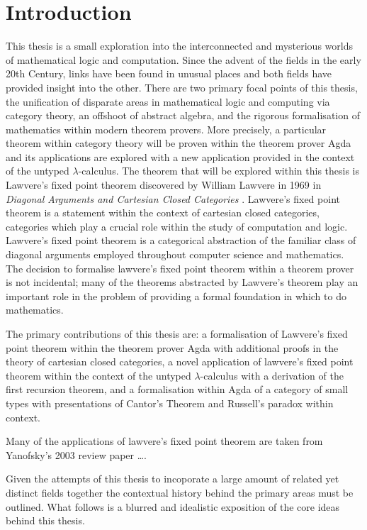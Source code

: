 
\section{Introduction}

This thesis is a small exploration into the interconnected and mysterious worlds
of mathematical logic and computation. Since the advent of the fields in the
early 20th Century, links have been found in unusual places and both fields have
provided insight into the other. There are two primary focal points of this
thesis, the unification of disparate areas in mathematical logic and computing
via category theory, an offshoot of abstract algebra, and the rigorous
formalisation of mathematics within modern theorem provers. More precisely, a
particular theorem within category theory will be proven within the theorem
prover Agda and its applications are explored with a new application provided in
the context of the untyped $\lambda$-calculus. The theorem that will
be explored within this thesis is Lawvere's fixed point theorem discovered by
William Lawvere in 1969 in \textit{Diagonal Arguments and Cartesian Closed
Categories} \cite{lawvere1969diagonal}. Lawvere's fixed point theorem
is a statement within the context of cartesian closed categories, categories
which play a crucial role within the study of computation and logic. Lawvere's
fixed point theorem is a categorical abstraction of the familiar class of
diagonal arguments employed throughout computer science and mathematics. The
decision to formalise lawvere's fixed point theorem within a theorem prover is
not incidental; many of the theorems abstracted by Lawvere's theorem play an
important role in the problem of providing a formal foundation in which to do
mathematics.

The primary contributions of this thesis are: a formalisation of Lawvere's fixed
point theorem within the theorem prover Agda with additional proofs in the
theory of cartesian closed categories, a novel application of lawvere's fixed
point theorem within the context of the untyped $\lambda$-calculus with a
derivation of the first recursion theorem, and a formalisation within Agda of a
category of small types with presentations of Cantor's Theorem and Russell's
paradox within context.

Many of the applications of lawvere's fixed point theorem are taken from
Yanofsky's 2003 review paper \ldots {}.

Given the attempts of this thesis to incoporate a large amount of related yet
distinct fields together the contextual history behind the primary areas must be
outlined. What follows is a blurred and idealistic exposition of the core ideas
behind this thesis.

